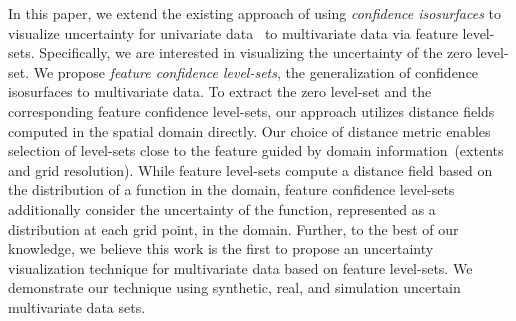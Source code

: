 In this paper, we extend the existing approach of using \textit{confidence isosurfaces} to visualize uncertainty for univariate data~\cite{zehner2010visualization} to multivariate data via feature level-sets.
%
Specifically, we are interested in visualizing the uncertainty of the zero level-set.
%
We propose \textit{feature confidence level-sets}, the generalization of confidence isosurfaces to multivariate data.
%
%
To extract the zero level-set and the corresponding feature confidence level-sets, our approach utilizes distance fields computed in the spatial domain directly.
%
Our choice of distance metric enables selection of level-sets close to the feature guided by domain information~(extents and grid resolution).
%
While feature level-sets compute a distance field based on the distribution of a function in the domain, feature confidence level-sets additionally consider the uncertainty of the function, represented as a distribution at each grid point, in the domain.
%
%
%
%
%
Further, to the best of our knowledge, we believe this work is the first to propose an uncertainty visualization technique for multivariate data based on feature level-sets. 
%
We demonstrate our technique using synthetic, real, and simulation uncertain multivariate data sets.


